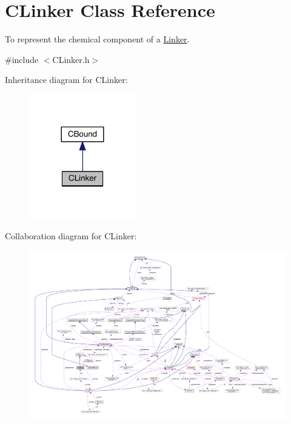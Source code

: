 \hypertarget{classCLinker}{\section{C\+Linker Class Reference}
\label{classCLinker}
}


To represent the chemical component of a \hyperlink{classLinker}{Linker}.  




{\ttfamily \#include $<$C\+Linker.\+h$>$}



Inheritance diagram for C\+Linker\+:\nopagebreak
\begin{figure}[H]
\begin{center}
\leavevmode
\includegraphics[width=132pt]{classCLinker__inherit__graph}
\end{center}
\end{figure}


Collaboration diagram for C\+Linker\+:\nopagebreak
\begin{figure}[H]
\begin{center}
\leavevmode
\includegraphics[width=350pt]{classCLinker__coll__graph}
\end{center}
\end{figure}
